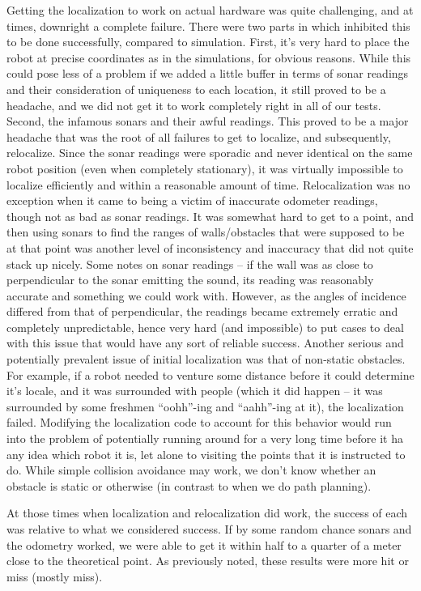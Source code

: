 \documentclass[12pt]{article}
\begin{document}
Getting the localization to work on actual hardware was quite challenging, and at times, downright a complete failure. There were two parts in which inhibited this to be done successfully, compared to simulation. 
First, it's very hard to place the robot at precise coordinates as in the simulations, for obvious reasons. While this could pose less of a problem if we added a little buffer in terms of sonar readings and their consideration of uniqueness to each location, it still proved to be a headache, and we did not get it to work completely right in all of our tests. Second, the infamous sonars and their awful readings. This proved to be a major headache that was the root of all failures to get to localize, and subsequently, relocalize. Since the sonar readings were sporadic and never identical on the same robot position (even when completely stationary), it was virtually impossible to localize efficiently and within a reasonable amount of time. Relocalization was no exception when it came to being a victim of inaccurate odometer readings, though not as bad as sonar readings. It was somewhat hard to get to a point, and then using sonars to find the ranges of walls/obstacles that were supposed to be at that point was another level of inconsistency and inaccuracy that did not quite stack up nicely.
Some notes on sonar readings – if the wall was as close to perpendicular to the sonar emitting the sound, its reading was reasonably accurate and something we could work with. However, as the angles of incidence differed from that of perpendicular, the readings became extremely erratic and completely unpredictable, hence very hard (and impossible) to put cases to deal with this issue that would have any sort of reliable success.
Another serious and potentially prevalent issue of initial localization was that of non-static obstacles. For example, if a robot needed to venture some distance before it could determine it's locale, and it was surrounded with people (which it did happen – it was surrounded by some freshmen “oohh”-ing and “aahh”-ing at it), the localization failed. Modifying the localization code to account for this behavior would run into the problem of potentially running around for a very long time before it ha any idea which robot it is, let alone to visiting the points that it is instructed to do. While simple collision avoidance may work, we don't know whether an obstacle is static or otherwise (in contrast to when we do path planning).

At those times when localization and relocalization did work, the success of each was relative to what we considered success. If by some random chance sonars and the odometry worked, we were able to get it within half to a quarter of a meter close to the theoretical point. As previously noted, these results were more hit or miss (mostly miss).
\end{document}
